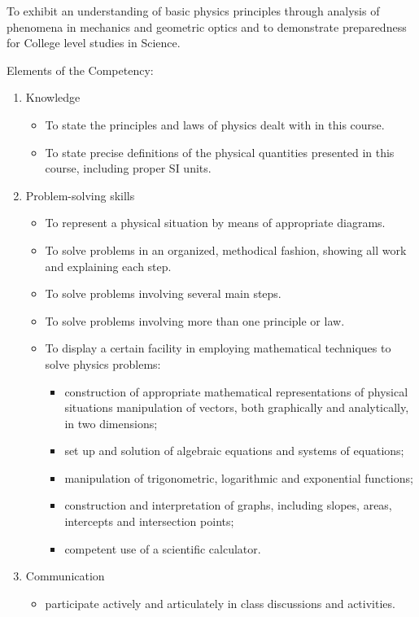 {To exhibit an understanding of basic physics principles through analysis of phenomena in mechanics and geometric optics and to demonstrate preparedness for College level studies in Science.
\smallskip

Elements of the Competency:
\smallskip
\begin{enumerate}
	\item Knowledge
	\begin{itemize}
		\item To state the principles and laws of physics dealt with in this course.
		\item To state precise definitions of the physical quantities presented in this course, including proper SI units.
	\end{itemize}
	\item Problem-solving skills
	\begin{itemize}	
		\item To represent a physical situation by means of appropriate diagrams.
		\item To solve problems in an organized, methodical fashion, showing all work and explaining each step.
		\item To solve problems involving several main steps.
		\item To solve problems involving more than one principle or law.
		\item To display a certain facility in employing mathematical techniques to solve physics problems:
		\begin{itemize}	
			\item construction of appropriate mathematical representations of physical situations manipulation of vectors, both graphically and analytically, in two dimensions;
			\item set up and solution of algebraic equations and systems of equations;
			\item manipulation of trigonometric, logarithmic and exponential functions;
			\item construction and interpretation of graphs, including slopes, areas, intercepts and intersection points;
			\item competent use of a scientific calculator.
		\end{itemize}
	\end{itemize}
	\item Communication
	\begin{itemize}
		\item participate actively and articulately in class discussions and activities.

\end{itemize}
\end{enumerate}}
